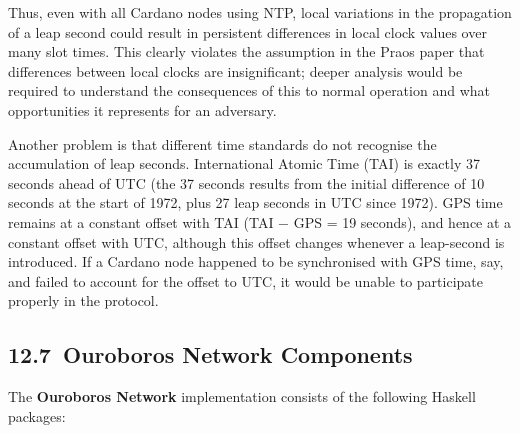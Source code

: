\documentclass[11pt,a4paper]{article}
\begin{document}
Thus, even with all Cardano nodes using NTP, local variations in the
propagation of a leap second could result in persistent differences in
local clock values over many slot times. This clearly violates the
assumption in the Praos paper that differences between local clocks are
insignificant; deeper analysis would be required to understand the
consequences of this to normal operation and what opportunities it
represents for an adversary.

Another problem is that different time standards do not recognise the
accumulation of leap seconds. International Atomic Time (TAI) is exactly
37 seconds ahead of UTC (the 37 seconds results from the initial
difference of 10 seconds at the start of 1972, plus 27 leap seconds in
UTC since 1972). GPS time remains at a constant offset with TAI (TAI −
GPS = 19 seconds), and hence at a constant offset with UTC, although
this offset changes whenever a leap-second is introduced. If a Cardano
node happened to be synchronised with GPS time, say, and failed to
account for the offset to UTC, it would be unable to participate
properly in the protocol.

\hypertarget{ouroboros-network-components}{%
\subsection{​12.7​~Ouroboros Network
Components}\label{ouroboros-network-components}}

The \textbf{Ouroboros Network} implementation consists of the following
Haskell packages:
\end{document}
